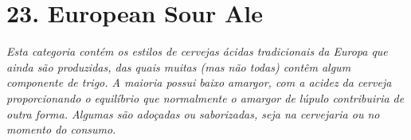 \section*{23. European Sour Ale}
\textit{Esta categoria contém os estilos de cervejas ácidas tradicionais da Europa que ainda são produzidas, das quais muitas (mas não todas) contêm algum componente de trigo. A maioria possui baixo amargor, com a acidez da cerveja proporcionando o equilíbrio que normalmente o amargor de lúpulo contribuiria de outra forma. Algumas são adoçadas ou saborizadas, seja na cervejaria ou no momento do consumo.}